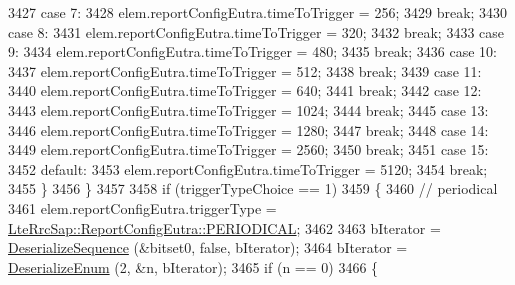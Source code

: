 \begin{DoxyCode}
3427                     \textcolor{keywordflow}{case} 7:
3428                       elem.reportConfigEutra.timeToTrigger = 256;
3429                       \textcolor{keywordflow}{break};
3430                     \textcolor{keywordflow}{case} 8:
3431                       elem.reportConfigEutra.timeToTrigger = 320;
3432                       \textcolor{keywordflow}{break};
3433                     \textcolor{keywordflow}{case} 9:
3434                       elem.reportConfigEutra.timeToTrigger = 480;
3435                       \textcolor{keywordflow}{break};
3436                     \textcolor{keywordflow}{case} 10:
3437                       elem.reportConfigEutra.timeToTrigger = 512;
3438                       \textcolor{keywordflow}{break};
3439                     \textcolor{keywordflow}{case} 11:
3440                       elem.reportConfigEutra.timeToTrigger = 640;
3441                       \textcolor{keywordflow}{break};
3442                     \textcolor{keywordflow}{case} 12:
3443                       elem.reportConfigEutra.timeToTrigger = 1024;
3444                       \textcolor{keywordflow}{break};
3445                     \textcolor{keywordflow}{case} 13:
3446                       elem.reportConfigEutra.timeToTrigger = 1280;
3447                       \textcolor{keywordflow}{break};
3448                     \textcolor{keywordflow}{case} 14:
3449                       elem.reportConfigEutra.timeToTrigger = 2560;
3450                       \textcolor{keywordflow}{break};
3451                     \textcolor{keywordflow}{case} 15:
3452                     \textcolor{keywordflow}{default}:
3453                       elem.reportConfigEutra.timeToTrigger = 5120;
3454                       \textcolor{keywordflow}{break};
3455                     \}
3456                 \}
3457 
3458               \textcolor{keywordflow}{if} (triggerTypeChoice == 1)
3459                 \{
3460                   \textcolor{comment}{// periodical}
3461                   elem.reportConfigEutra.triggerType = 
      \hyperlink{structns3_1_1LteRrcSap_1_1ReportConfigEutra_a457763ab0765f15b66c62f8177fa412ea9b58d8f6c6d7ba8e59b08379fc3d92e7}{LteRrcSap::ReportConfigEutra::PERIODICAL};
3462 
3463                   bIterator = \hyperlink{classns3_1_1Asn1Header_a58c68bb97ba3fe2e8fcdd7c208d672b2}{DeserializeSequence} (&bitset0, \textcolor{keyword}{false}, bIterator);
3464                   bIterator = \hyperlink{classns3_1_1Asn1Header_a4fcc253e0eec3483c775b005c1875f2d}{DeserializeEnum} (2, &n, bIterator);
3465                   \textcolor{keywordflow}{if} (n == 0)
3466                     \{

\end{DoxyCode}
